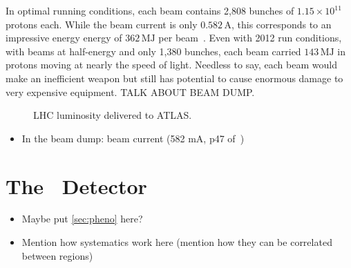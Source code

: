 In optimal running conditions, each beam contains 2,808 bunches of $1.15 \times 10^{11}$ protons each.
While the beam current is only $0.582\,\text{A}$, this corresponds to an impressive energy energy of $362\,\text{MJ}$ per beam~\cite{lhc-machine}.
Even with 2012 run conditions, with beams at half-energy and only 1,380 bunches, each beam carried $143\,\text{MJ}$ in protons moving at nearly the speed of light.
Needless to say, each beam would make an inefficient weapon but still has potential to cause enormous damage to very expensive equipment.
TALK ABOUT BEAM DUMP.

\begin{figure}
  \caption[LHC Luminosity Delivered to ATLAS]{%
    LHC luminosity delivered to ATLAS.}
\end{figure}
\begin{itemize}
  \item In the beam dump: beam current (582 mA, p47 of~\cite{lhc-machine})
\end{itemize}


\section{The \atlas\ Detector}
\label{sec:atlas}
\begin{itemize}
\item Maybe put \cref{sec:pheno} here?
\item Mention how systematics work here (mention how they can be correlated between regions)
\end{itemize}
